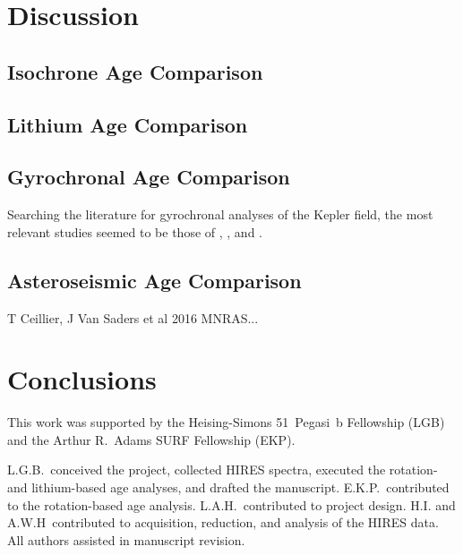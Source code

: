 \documentclass[12pt,twocolumn,tighten]{aastex63}
\begin{document}
\section{Discussion}
\label{sec:disc}

\subsection{Isochrone Age Comparison}

\subsection{Lithium Age Comparison}

\subsection{Gyrochronal Age Comparison}
Searching the literature for gyrochronal analyses of the Kepler field,
the most relevant studies seemed to be those of
\citet{Walkowicz_2013}, \citet{Reinhold_2015}, and 
\citet{David_2021}.

\subsection{Asteroseismic Age Comparison}
T Ceillier, J Van Saders et al 2016 MNRAS...


\section{Conclusions}
\label{sec:conclusions}

\acknowledgements
This work was supported by the 
Heising-Simons 51~Pegasi~b Fellowship (LGB)
and the Arthur R.~Adams SURF Fellowship (EKP).

L.G.B.~conceived the project, collected HIRES spectra, executed the
rotation- and lithium-based age analyses, and drafted the manuscript.
E.K.P.~contributed to the rotation-based age analysis.
L.A.H.~contributed to project design.
H.I. and A.W.H~contributed to acquisition, reduction, and analysis of
the HIRES data.
All authors assisted in manuscript revision.









\clearpage
\listofchanges
\end{document}
